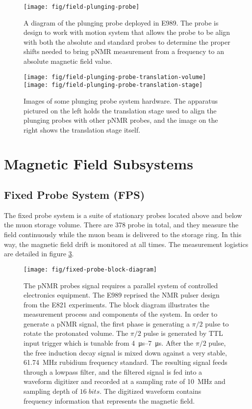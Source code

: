 \begin{figure}
\label{fig:field-plunging-probe}
\centering
\texttt{[image: fig/field-plunging-probe]}
\caption{A diagram of the plunging probe deployed in E989.  The probe is design to work with motion system that allows the probe to be align with both the absolute and standard probes to determine the proper shifts needed to bring pNMR measurement from a frequency to an absolute magnetic field value.}
\end{figure}

\begin{figure}
\label{fig:field-plunging-probe-translation-stage}
\centering
\texttt{[image: fig/field-plunging-probe-translation-volume]}
\texttt{[image: fig/field-plunging-probe-translation-stage]}
\caption{Images of some plunging probe system hardware.  The apparatus pictured on the left holds the translation stage used to align the plunging probes with other pNMR probes, and the image on the right shows the translation stage itself.}
\end{figure}

\section{Magnetic Field Subsystems} \label{sec:field-subsystems}

\subsection{Fixed Probe System (FPS)}

The fixed probe system is a suite of stationary probes located above and below the muon storage volume.  There are 378 probe in total, and they measure the field continuously while the muon beam is delivered to the storage ring.  In this way, the magnetic field drift is monitored at all times.  The measurement logistics are detailed in figure \ref{fig:fixed-probe-block-diagram}.

\begin{figure}
\label{fig:fixed-probe-block-diagram}
\centering
\texttt{[image: fig/fixed-probe-block-diagram]}
\caption{The pNMR probes signal requires a parallel system of controlled electronics equipment.  The E989 reprised the NMR pulser design from the E821 experiments. The block diagram illustrates the measurement process and components of the system.  In order to generate a pNMR signal, the first phase is generating a $\pi/2$ pulse to rotate the protonated volume.  The $\pi/2$ pulse is generated by TTL input trigger which is tunable from \SIrange{4}{7}{\micro\second}.  After the $\pi/2$ pulse, the free induction decay signal is mixed down against a very stable, \SI{61.74}{\MHz} rubidium frequency standard.  The resulting signal feeds through a lowpass filter, and the filtered signal is fed into a waveform digitizer and recorded at a sampling rate of \SI{10}{\MHz} and sampling depth of $16\;bits$.  The digitized waveform contains frequency information that represents the magnetic field.}
\end{figure}

